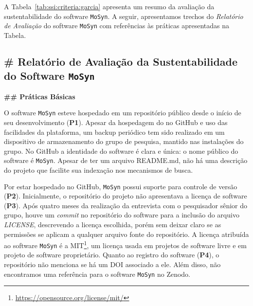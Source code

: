 A Tabela~\ref{tab:ssi:criteria:garcia} apresenta um resumo da avaliação da sustentabilidade do software \texttt{MoSyn}.
A seguir, apresentamos trechos do \textit{Relatório de Avaliação} do software \texttt{MoSyn} com referências às práticas apresentadas na Tabela.



\subsection*{\# Relatório de Avaliação da Sustentabilidade do Software \texttt{MoSyn}}

\noindent \textbf{\#\# Práticas Básicas}

O software \texttt{MoSyn} esteve hospedado em um repositório público desde o início de seu desenvolvimento (\textbf{P1}).
Apesar da hospedagem do \RSw no GitHub
e uso das facilidades da plataforma,
um backup periódico tem sido realizado em um dispositivo de armazenamento do grupo de pesquisa, mantido nas instalações do grupo.
%
No GitHub a identidade do software é clara e única: o nome público do software é \texttt{MoSyn}. Apesar de ter um arquivo README.md, não há uma descrição do projeto que facilite sua indexação nos mecanismos de busca.

Por estar hospedado no GitHub, \texttt{MoSyn} possui suporte para controle de versão (\textbf{P2}). 
Inicialmente, o repositório do projeto não apresentava a licença de software (\textbf{P3}). Após quatro meses da realização da entrevista com o pesquisador sênior do grupo, 
houve um \textit{commit} no repositório do software para a inclusão do arquivo  \textit{LICENSE}, descrevendo a licença escolhida, porém sem deixar claro se as permissões se aplicam a qualquer arquivo fonte do repositório.
A licença atribuída ao software \texttt{MoSyn} é a MIT\footnote{\url{https://opensource.org/license/mit/}}, um licença usada em projetos de software livre e em projeto de software proprietário.
Quanto ao registro do software (\textbf{P4}),
o repositório não menciona se há um DOI associado a ele. Além disso, não encontramos uma referência para o software \texttt{MoSyn} no Zenodo.


